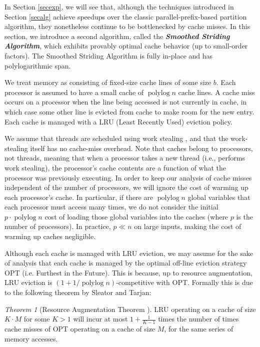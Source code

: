 \documentclass[sigplan, 10pt, nonacm]{acmart}
\newcommand{\polylog}{\operatorname{polylog}}
\newcommand{\defn}[1]{{\textit{\textbf{\boldmath #1}}}}
\renewcommand{\paragraph}[1]{\vspace{0.09in}\noindent{\bf \boldmath #1.}}
\theoremstyle{remark}
\newtheorem{theorem}{Theorem}[section]
\theoremstyle{remark}
\begin{document}
In Section \ref{secexp}, we will see that, although the techniques
introduced in Section \ref{secalg} achieve speedups over the classic
parallel-prefix-based partition algorithm, they nonetheless continue
to be bottlenecked by cache misses. In this section, we introduce a
second algorithm, called the \defn{Smoothed Striding Algorithm}, which
exhibits provably optimal cache behavior (up to small-order
factors). The Smoothed Striding Algorithm is fully in-place and has
polylogarithmic span.



\paragraph{Modeling Cache Misses}
We treat memory as consisting of fixed-size cache lines of some
size $b$. Each processor is assumed to have a small cache of
$\operatorname{polylog}{n}$ cache lines.  A cache miss occurs on a
processor when the line being accessed is not currently in cache, in
which case some other line is evicted from cache to make room for the
new entry.  Each cache is managed with a LRU (Least Recently Used)
eviction policy.

We assume that threads are scheduled using work stealing \cite{AcarBl00},
and that the work-stealing itself has no cache-miss overhead. Note
that caches belong to processors, not threads, meaning that when a
processor takes a new thread (i.e., performs work stealing), the
processor's cache contents are a function of what the processor was
previously executing. In order to keep our analysis of cache misses
independent of the number of processors, we will ignore the cost of
warming up each processor's cache. In particular, if there are
$\polylog n$ global variables that each processor must access many
times, we do not consider the initial $p \cdot \polylog n$ cost of
loading those global variables into the caches (where $p$ is the
number of processors). In practice, $p \ll n$ on large inputs, making
the cost of warming up caches negligible.

Although each cache is managed with LRU eviction, we may assume
for the sake of analysis that each cache is managed by the optimal
off-line eviction strategy OPT (i.e. Furthest in the Future). This is
because, up to resource augmentation, LRU eviction is $(1 + 1/\polylog
n)$-competitive with OPT. Formally this is due to the following
theorem by Sleator and Tarjan:
\begin{theorem}[Resource Augmentation Theorem \cite{SleatorTa85}]
  LRU operating on a cache of size $K\cdot M$ for some $K>1$ will incur at most
  $1+\frac{1}{K-1}$ times the number of times cache misses of OPT operating on
  a cache of size $M$, for the same series of memory accesses.
  \label{thm:augmentation}
\end{theorem}
\end{document}

